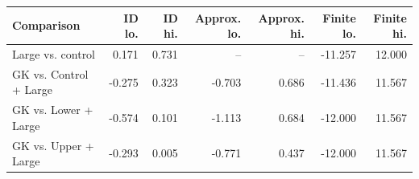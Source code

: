 \begin{tabular}{lrrrrrr}
\toprule
Comparison & ID lo. & ID hi. & Approx. lo. & Approx. hi. & Finite lo. & Finite hi. \\
\midrule
Large vs. control & 0.171 & 0.731 & -- & -- & -11.257 & 12.000 \\
GK vs. Control + Large & -0.275 & 0.323 & -0.703 & 0.686 & -11.436 & 11.567 \\
GK vs. Lower + Large & -0.574 & 0.101 & -1.113 & 0.684 & -12.000 & 11.567 \\
GK vs. Upper + Large & -0.293 & 0.005 & -0.771 & 0.437 & -12.000 & 11.567 \\
\bottomrule
\end{tabular}
